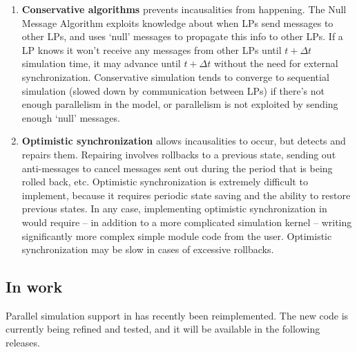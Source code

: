 \begin{enumerate}
  \item{\textbf{Conservative algorithms}
    prevents incausalities from happening. The Null Message Algorithm
    exploits knowledge about when LPs send messages to other LPs,
    and uses `null' messages to propagate this info to other LPs.
    If a LP knows it won't receive any messages from other
    LPs until $t+\Delta t$ simulation time, it may advance until
    $t+\Delta t$ without the need for external synchronization.
    Conservative simulation tends to converge to sequential simulation
    (slowed down by communication between LPs) if there's not
    enough parallelism in the model, or parallelism is not exploited
    by sending enough `null' messages.}

  \item{\textbf{Optimistic synchronization}
    allows incausalities to occur, but detects and
    repairs them. Repairing involves rollbacks to a previous state,
    sending out anti-messages to cancel messages sent out during the
    period that is being rolled back, etc.  Optimistic synchronization
    is extremely difficult to implement, because it requires periodic
    state saving and the ability to restore previous states. In any
    case, implementing optimistic synchronization in {\opp} would
    require -- in addition to a more complicated simulation kernel --
    writing significantly more complex simple
    module code from the user.  Optimistic synchronization may be slow
    in cases of excessive rollbacks.}
\end{enumerate}


\subsection{In work}

Parallel simulation support in {\opp} has recently been reimplemented.
The new code is currently being refined and tested, and it will be
available in the following releases.


